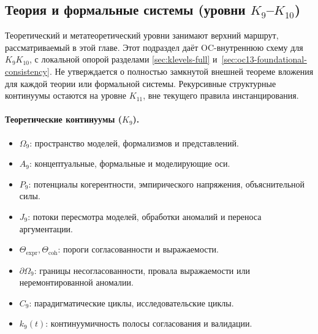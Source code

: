 \subsection{Теория и формальные системы (уровни
            \texorpdfstring{$K_9$}{K9}--\texorpdfstring{$K_{10}$}{K10})}

Теоретический и метатеоретический уровни занимают верхний маршрут, рассматриваемый
в этой главе. Этот подраздел даёт OC-внутреннюю схему для
\(K_9\)\textendash\(K_{10}\), с локальной опорой разделами
\ref{sec:klevels-full} и~\ref{sec:oc13-foundational-consistency}.
Не утверждается о полностью замкнутой внешней теореме вложения для каждой
теории или формальной системы. Рекурсивные структурные континуумы остаются на
уровне \(K_{11}\), вне текущего правила инстанцирования.

\paragraph{Теоретические континуумы (\texorpdfstring{$K_9$}{K9}).}
\begin{itemize}
  \item \(\Omega_9\): пространство моделей, формализмов и представлений.
  \item \(A_9\): концептуальные, формальные и моделирующие оси.
  \item \(P_9\): потенциалы когерентности, эмпирического напряжения,
        объяснительной силы.
  \item \(J_9\): потоки пересмотра моделей, обработки аномалий и
        переноса аргументации.
  \item \(\Theta_{\mathrm{expr}}, \Theta_{\mathrm{coh}}\): пороги
        согласованности и выражаемости.
  \item \(\partial\Omega_9\): границы несогласованности, провала
        выражаемости или неремонтированной аномалии.
  \item \(C_9\): парадигматические циклы, исследовательские циклы.
  \item \(k_9(t)\): континуумичность полосы согласования и валидации.
\end{itemize}

